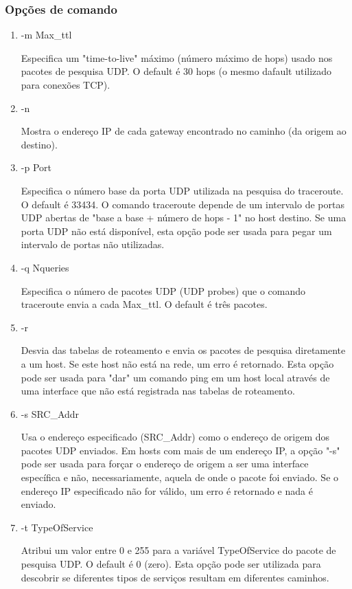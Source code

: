 \documentclass[
	article,			%
	11pt,				%
	oneside,			%
	a4paper,			%
	section=TITLE,		%
	english,			%
	brazil,				%
	sumario=tradicional
	]{abntex2}
\begin{document}
\subsubsection{Opções de comando}
\begin{enumerate}
	\item -m Max\_ttl
	
	Especifica um "time-to-live" máximo (número máximo de hops) usado nos pacotes de pesquisa UDP. O default é  30 hops  (o mesmo dafault utilizado para conexões TCP).
	
	\item -n
	
	Mostra o endereço IP de cada gateway encontrado no caminho (da origem ao destino).
	
		
	\item -p Port   
	
	Especifica o número base da porta UDP utilizada na pesquisa do traceroute. O default é 33434. O comando traceroute depende de um intervalo de portas UDP abertas de "base a base + número de hops - 1" no host destino. Se uma porta UDP não está disponível, esta opção pode ser usada para pegar um intervalo de portas não utilizadas.

	\item -q Nqueries 
	
	Especifica o número de pacotes UDP (UDP probes) que o comando traceroute envia a cada Max\_ttl. O default é três pacotes.
	
	\item -r  	
	
	Desvia das tabelas de roteamento e envia os pacotes de pesquisa diretamente a um host. Se este host não está na rede, um erro é retornado. Esta opção pode ser usada para "dar" um comando ping em um host local através de uma interface que não está registrada nas tabelas de roteamento.
	
	\item -s SRC\_Addr
		
	Usa o endereço especificado (SRC\_Addr) como o endereço de origem dos pacotes UDP enviados. Em hosts com mais de um endereço IP, a opção "-s" pode ser usada para forçar o endereço de origem a ser uma interface específica e não, necessariamente, aquela de onde o pacote foi enviado. Se o endereço IP especificado não for válido, um erro é retornado e nada é enviado.
	

	\item -t TypeOfService
	
	Atribui um valor entre 0 e 255 para a variável TypeOfService do pacote de pesquisa UDP. O default é 0 (zero). Esta opção pode ser utilizada para descobrir se diferentes tipos de serviços resultam em diferentes caminhos.
	

\end{enumerate}
\end{document}

